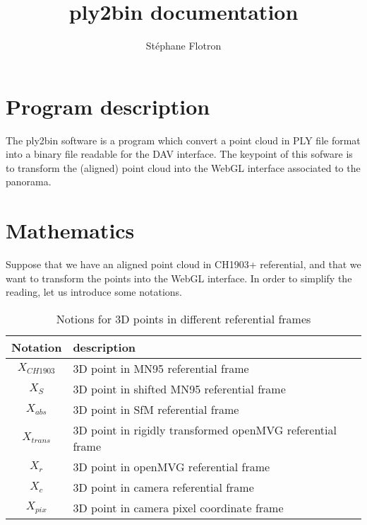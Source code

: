 \documentclass[a4paper, 11pt]{article}
\author{ St\'ephane Flotron }
\title{\textbf{ply2bin documentation}}
\begin{document}
   \maketitle
   
   \section*{Program description}
   
   The ply2bin software is a program which convert a point cloud in PLY file format into 
   a binary file readable for the DAV interface. 
   The keypoint of this sofware is to transform the (aligned) point cloud into the WebGL
   interface associated to the panorama.
   
   \section*{Mathematics}
   
   Suppose that we have an aligned point cloud in CH1903+ referential, and that we want to transform the points into
   the WebGL interface. In order to simplify the reading, let us introduce some notations. 
   
   \begin{table}[H]
      \begin{center}
        \begin{tabular}{|c|l|}
                \hline 
                    Notation & description \\
                \hline
                    $X_{CH1903}$ & 3D point in MN95 referential frame \\
                    $X_S$       & 3D point in shifted MN95 referential frame \\
                    $X_{abs}$   & 3D point in SfM referential frame \\
                    $X_{trans}$ & 3D point in rigidly transformed openMVG referential frame \\
                    $X_r$       & 3D point in openMVG referential frame \\
                    $X_c$       & 3D point in camera referential frame \\
                    $X_{pix}$   & 3D point in camera pixel coordinate frame \\
                \hline
        \end{tabular}
      \end{center}
      \label{3D point notation}
      \caption{Notions for 3D points in different referential frames}
   \end{table}
   
\end{document}
